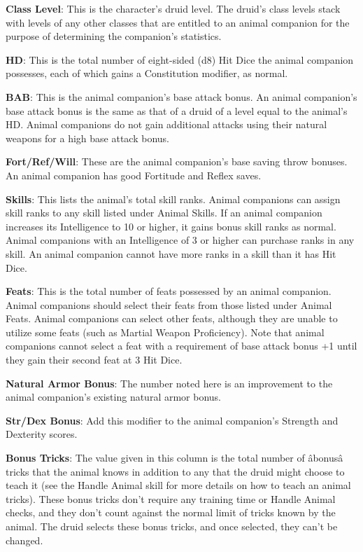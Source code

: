 
				
\textbf{Class Level}: This is the character's druid level. The druid's class levels stack with levels of any other classes that are entitled to an animal companion for the purpose of determining the companion's statistics.
				
\textbf{HD}: This is the total number of eight-sided (d8) Hit Dice the animal companion possesses, each of which gains a Constitution modifier, as normal. 
				
\textbf{BAB}: This is the animal companion's base attack bonus. An animal companion's base attack bonus is the same as that of a druid of a level equal to the animal's HD. Animal companions do not gain additional attacks using their natural weapons for a high base attack bonus.
				
\textbf{Fort/Ref/Will}: These are the animal companion's base saving throw bonuses. An animal companion has good Fortitude and Reflex saves.
				
\textbf{Skills}: This lists the animal's total skill ranks. Animal companions can assign skill ranks to any skill listed under Animal Skills. If an animal companion increases its Intelligence to 10 or higher, it gains bonus skill ranks as normal. Animal companions with an Intelligence of 3 or higher can purchase ranks in any skill. An animal companion cannot have more ranks in a skill than it has Hit Dice.
				
\textbf{Feats}: This is the total number of feats possessed by an animal companion. Animal companions should select their feats from those listed under Animal Feats. Animal companions can select other feats, although they are unable to utilize some feats (such as Martial Weapon Proficiency). Note that animal companions cannot select a feat with a requirement of base attack bonus +1 until they gain their second feat at 3 Hit Dice.
				
\textbf{Natural Armor Bonus}: The number noted here is an improvement to the animal companion's existing natural armor bonus.
				
\textbf{Str/Dex Bonus}: Add this modifier to the animal companion's Strength and Dexterity scores.
				
\textbf{Bonus Tricks}: The value given in this column is the total number of \^abonus\^a tricks that the animal knows in addition to any that the druid might choose to teach it (see the Handle Animal skill for more details on how to teach an animal tricks). These bonus tricks don't require any training time or Handle Animal checks, and they don't count against the normal limit of tricks known by the animal. The druid selects these bonus tricks, and once selected, they can't be changed. 
				
